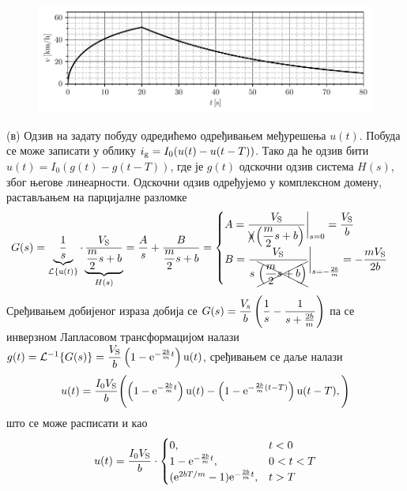 \begin{figure}[b!]
    \centering
    \includegraphics[scale=1]{fig/tram_plot.pdf}
    \caption{}
\end{figure}

    (в) Одзив на задату побуду одредићемо одређивањем међурешења $u(t)$. Побуда се може записати у облику 
    $i_{\rm g} = I_0 (u(t) - u(t - T))$. Тако да ће одзив бити 
    $u(t) = I_0 (g(t) - g(t - T))$, где је $g(t)$ одскочни одзив система $H(s)$, због његове линеарности. 
    Одскочни одзив одређујемо у комплексном домену, растављањем на парцијалне разломке
    \begin{align}
        G(s) = \underbrace{\dfrac{1}{s}}_{\mathcal{L}\left\{{\rm u}(t)\right\}} \cdot \underbrace{\dfrac{V_{\rm S}}{ \dfrac{m}{2} s + b } }_{H(s)}
        = \dfrac{A}{s} + \dfrac{B}{\dfrac{m}{2} s + b} 
        = 
        \begin{cases}
            A =  \dfrac{V_{\rm S}}{ \xcancel{s}\left( \dfrac{m}{2} s + b\right) } \bigg|_{s = 0} = \dfrac{V_{\rm S}}{b} \\
            B =  \dfrac{V_{\rm S}}{ {s} \,\, \xcancel{\left( \dfrac{m}{2} s + b\right) } } \bigg|_{s = -\frac{2b}{m}} = 
            -\dfrac{m V_{\rm S}}{2b}
        \end{cases}
    \end{align}
    Сређивањем добијеног израза добија се 
    $
    G(s) = \dfrac{V_{\rm s}}{b} \left( \dfrac{1}{s} - \dfrac{1}{s + \frac{2b}{m}} \right)$ \vspace*{1mm} 
    па се инверзном Лапласовом трансформацијом налази
    $g(t) = \mathcal{L}^{-1} \{ G(s) \} = \dfrac{V_{\rm S}}{b} \left(1 - {\rm e}^{ -\frac{2b}{m} t } \right) {\rm u}(t) $, 
    сређивањем се даље налази
    \begin{equation}
    u(t) = \dfrac{I_0 V_{\rm S}}{b} \Biggl(
        \left(1 - {\rm e}^{ -\frac{2b}{m} t } \right) {\rm u}(t) 
        -
        \left(1 - {\rm e}^{ -\frac{2b}{m} (t - T)} \right) {\rm u}(t - T),
    \Biggr)
    \end{equation}
    што се може расписати и као 
    \begin{eqnarray}
        u(t) = \dfrac{I_0 V_{\rm S}}{b} \cdot 
        \begin{cases}
            0 , & t < 0 \\
            1 - {\rm e}^{-\frac{2b}{m}t} , & 0 < t < T \\
            ( {\rm e}^{2bT/m} - 1) {\rm e}^{-\frac{2b}{m}t} , & t > T 
        \end{cases}
    \end{eqnarray}
